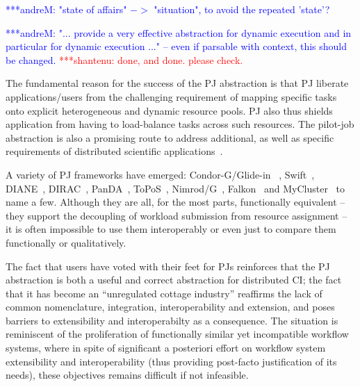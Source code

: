 \documentclass[conference,final]{IEEEtran}
\newcommand{\jhanote}[1]{ {\textcolor{red} { ***shantenu: #1 }}}
\newcommand{\amnote}[1]{ {\textcolor{blue} { ***andreM: #1 }}}
\newcommand{\amnote}[1]{}
\newcommand{\jhanote}[1]{}
\begin{document}
\amnote{"state of affairs" $->$ "situation", to avoid the repeated
'state'?}

\amnote{"... provide a very effective abstraction for dynamic
  execution and in particular for dynamic execution ..." -- even if
  parsable with context, this should be changed.}\jhanote{done, and
  done. please check.}

The fundamental reason for the success of the PJ abstraction is that
PJ liberate applications/users from the challenging requirement of
mapping specific tasks onto explicit heterogeneous and dynamic
resource pools.  PJ also thus shields application from having to
load-balance tasks across such resources.  The pilot-job abstraction
is also a promising route to address additional, as well as specific
requirements of distributed scientific
applications~\cite{ko-efficient,DBLP:conf/hpdc/KimHMAJ10}.

A variety of PJ frameworks have emerged:
Condor-G/Glide-in~\cite{condor-g} , Swift~\cite{Wilde2011},
DIANE~\cite{Moscicki:908910}, DIRAC~\cite{1742-6596-219-6-062049},
PanDA~\cite{1742-6596-219-6-062041}, ToPoS~\cite{topos},
Nimrod/G~\cite{10.1109/HPC.2000.846563}, Falkon~\cite{1362680} and
MyCluster~\cite{1652061} to name a few. Although they are all, for the
most parts, functionally equivalent -- they support the decoupling of
workload submission from resource assignment -- it is often impossible
to use them interoperably or even just to compare them functionally or
qualitatively.




The fact that users have voted with their feet for PJs reinforces that
the PJ abstraction is both a useful and correct abstraction for
distributed CI; the fact that it has become an ``unregulated cottage
industry'' reaffirms the lack of common nomenclature, integration,
interoperability and extension, and poses barriers to extensibility and
interoperabilty as a consequence.  The situation is reminiscent of the
proliferation of functionally similar yet incompatible workflow
systems, where in spite of significant a posteriori effort on workflow
system extensibility and interoperability (thus providing post-facto
justification of its needs), these objectives remains difficult if not
infeasible.


\end{document}
